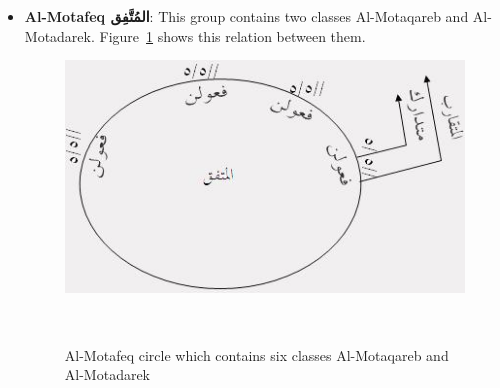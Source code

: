 \begin{itemize}
\item \textbf{Al-Motafeq \textarabic{المُتَّفِق}}: This group contains two classes Al-Motaqareb and Al-Motadarek. Figure~\ref{fig:Circle_Motafeq} shows this relation between them.

\begin{figure}[H]
\includegraphics{./Figures/Ch_2_Background/Al-Motafeq.jpg}
\caption{Al-Motafeq circle which contains six classes Al-Motaqareb and Al-Motadarek}~\label{fig:Circle_Motafeq}
\end{figure}


\end{itemize}

\newpage


